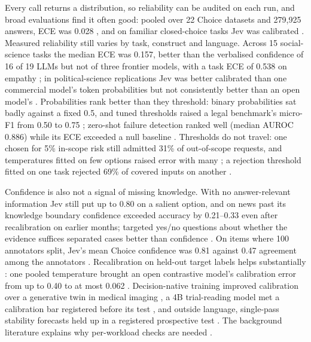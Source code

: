 Every call returns a distribution, so reliability can be audited on each run, and broad evaluations find it often good: pooled over 22 Choice datasets and 279,925 answers, ECE was 0.028 \citep{arxiv2609_37647}, and on familiar closed-choice tasks Jev was calibrated \citep{arxiv2610_01006}. Measured reliability still varies by task, construct and language. Across 15 social-science tasks the median ECE was 0.157, better than the verbalised confidence of 16 of 19 LLMs but not of three frontier models, with a task ECE of 0.538 on empathy \citep{arxiv2609_24574}; in political-science replications Jev was better calibrated than one commercial model's token probabilities but not consistently better than an open model's \citep{arxiv2610_06625}. Probabilities rank better than they threshold: binary probabilities sat badly against a fixed 0.5, and tuned thresholds raised a legal benchmark's micro-F1 from 0.50 to 0.75 \citep{arxiv2609_37647}; zero-shot failure detection ranked well (median AUROC 0.886) while its ECE exceeded a null baseline \citep{arxiv2609_29429}. Thresholds do not travel: one chosen for 5\% in-scope risk still admitted 31\% of out-of-scope requests, and temperatures fitted on few options raised error with many \citep{arxiv2610_00346}; a rejection threshold fitted on one task rejected 69\% of covered inputs on another \citep{arxiv2610_03387}.

Confidence is also not a signal of missing knowledge. With no answer-relevant information Jev still put up to 0.80 on a salient option, and on news past its knowledge boundary confidence exceeded accuracy by 0.21–0.33 even after recalibration on earlier months; targeted yes/no questions about whether the evidence suffices separated cases better than confidence \citep{arxiv2610_01006}. On items where 100 annotators split, Jev's mean Choice confidence was 0.81 against 0.47 agreement among the annotators \citep{gh_gautamtalksdev_jevbench}. Recalibration on held-out target labels helps substantially \citep{arxiv2609_24052,arxiv2609_27607}: one pooled temperature brought an open contrastive model's calibration error from up to 0.40 to at most 0.062 \citep{arxiv2610_07177}. Decision-native training improved calibration over a generative twin in medical imaging \citep{arxiv2610_00381}, a 4B trial-reading model met a calibration bar registered before its test \citep{arxiv2610_07019}, and outside language, single-pass stability forecasts held up in a registered prospective test \citep{arxiv2610_06985}. The background literature explains why per-workload checks are needed \citep{arxiv1906_02530,arxiv2608_19558}.

